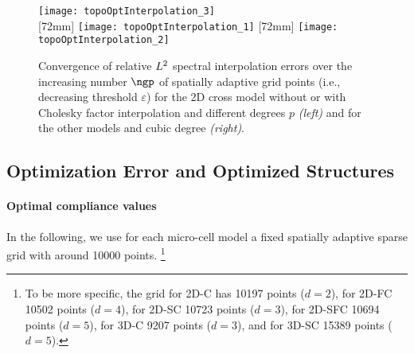 \begin{figure}
  \hspace*{5mm}%
  \texttt{[image: topoOptInterpolation\_3]}%
  \hfill%
  \\[2mm]%
  [72mm]{%
    \texttt{[image: topoOptInterpolation\_1]}%
  }%
  \hfill%
  [72mm]{%
    \texttt{[image: topoOptInterpolation\_2]}%
  }%
  \caption[Convergence of relative $L^2$ spectral interpolation errors]{%
    Convergence of relative $L^2$ spectral interpolation errors
    over the increasing number $\ngp$ of spatially adaptive grid points
    (i.e., decreasing threshold $\varepsilon$)
    for the 2D cross model without or with Cholesky factor interpolation
    and different degrees $p$ \emph{(left)} and
    for the other models and cubic degree \emph{(right)}.%
  }%
  \label{fig:topoOptInterpolationErrorBasisFunctions}%
\end{figure}



\subsection{Optimization Error and Optimized Structures}
\label{sec:644optimization}

\paragraph{Optimal compliance values}

In the following, we use for each micro-cell model
a fixed spatially adaptive sparse grid with around \num{10000} points.%
\footnote{%
  To be more specific,
  the grid for 2D-C has \num{10197} points ($d = 2$),
  for 2D-FC \num{10502} points ($d = 4$),
  for 2D-SC \num{10723} points ($d = 3$),
  for 2D-SFC \num{10694} points ($d = 5$),
  for 3D-C \num{9207} points ($d = 3$), and
  for 3D-SC \num{15389} points ($d = 5$).%
}

\dummytext[2]{}


